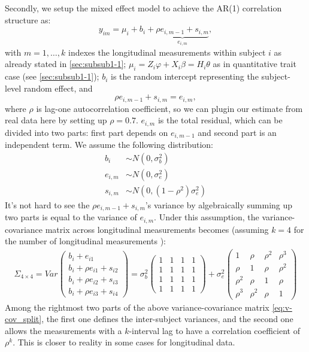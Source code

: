 \documentclass[12pt]{article}
\begin{document}
Secondly, we setup the mixed effect model to achieve the AR(1) correlation structure as:\\
\begin{equation}
y_{im} = \mu_{i} + b_i + \underbrace{ \rho e_{i,m-1} + s_{i,m} }_{ e_{i,m} }  ,
\label{eq:y_im_split}
\end{equation}
with $m = 1,\ldots,k$ indexes the longitudinal measurements within subject $i$ as already stated in \ref{sec:subsub1-1}; $\mu_{i} = Z_i \varphi + X_i \beta = H_i \theta$ as in quantitative trait case (see \ref{sec:subsub1-1}); $b_i$ is the random intercept representing the subject-level random effect, and
$$
\rho e_{i,m-1} + s_{i,m} = e_{i,m},
$$ 
where $\rho$ is lag-one autocorrelation coefficient, so we can plugin our estimate from real data here by setting up $\rho = 0.7$. $e_{i,m}$ is the total residual, which can be divided into two parts: first part depends on $e_{i,m-1}$ and second part is an independent term. We assume the following distribution:\\
\begin{align*}
b_i & \sim N(0,\sigma_b^2)\\
e_{i,m} & \sim  N(0, \sigma_e^2)\\
s_{i,m} & \sim  N(0, (1 - \rho^2) \sigma_e^2 )
\end{align*}
It's not hard to see the $\rho e_{i,m-1} + s_{i,m}$'s variance by algebraically summing up two parts is equal to the variance of $e_{i,m}$. Under this assumption, the variance-covariance matrix across longitudinal measurements becomes (assuming $k = 4$ for the number of longitudinal measurements ):
\begin{eqnarray}
\Sigma_{4\times 4} = Var 
\begin{pmatrix}
b_i + e_{i1}\\
b_i + \rho e_{i1} + s_{i2}\\
b_i + \rho e_{i2} + s_{i3}\\
b_i + \rho e_{i3} + s_{i4}
\end{pmatrix}
= \sigma_b^2
\begin{pmatrix}
1 & 1 & 1 & 1\\
1 & 1 & 1 & 1\\
1 & 1 & 1 & 1\\
1 & 1 & 1 & 1
\end{pmatrix}
+ \sigma_e^2 
\begin{pmatrix}
1 & \rho & \rho^2 & \rho^3 \\
\rho & 1 & \rho & \rho^2 \\
\rho^2 & \rho & 1 & \rho \\
\rho^3 & \rho^2 & \rho & 1
\end{pmatrix}
\label{eq:v-cov_split}
\end{eqnarray}
Among the rightmost two parts of the above variance-covariance matrix \eqref{eq:v-cov_split}, the first one defines the inter-subject variances, and the second one allows the measurements with a $k$-interval lag to have a correlation coefficient of $\rho ^ k$. This is closer to reality in some cases for longitudinal data. 
\end{document}
